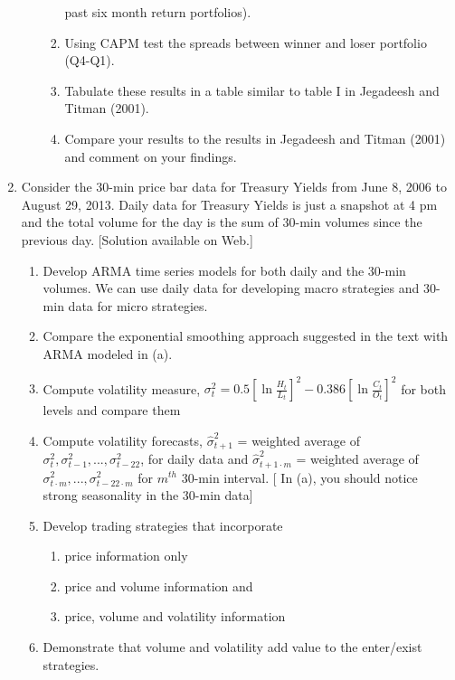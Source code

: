 \begin{enumerate}[1.]
\begin{enumerate}[6.1]
\begin{enumerate}[1.]
past six month return portfolios).
    \item Using CAPM test the spreads between winner and loser portfolio (Q4-Q1).
    \item Tabulate these results in a table similar to table I in Jegadeesh and Titman (2001).
    \item Compare your results to the results in Jegadeesh and Titman (2001) and comment on your findings.
    \end{enumerate}
    \end{enumerate}
    
    
\item Consider the 30-min price bar data for Treasury Yields from June 8, 2006 to August 29, 2013. Daily data for Treasury Yields is just a snapshot at 4 pm and the total volume for the day is the sum of 30-min volumes since the previous day. [Solution available on Web.]
   \begin{enumerate}
   \item Develop ARMA time series models for both daily and the 30-min volumes. We can use daily data
for developing macro strategies and 30-min data for micro strategies.
\item Compare the exponential smoothing approach suggested in the text with ARMA modeled in (a).
   \item Compute volatility measure, $\sigma_t^2 = 0.5[\ln{\frac{H_t}{L_t}}]^2 - 0.386[\ln{\frac{C_t}{O_t}}]^2$ for both levels and compare them
   \item Compute volatility forecasts, $\hat{\sigma}_{t+1}^2$ = weighted average of $\sigma_{t}^2, \sigma_{t-1}^2,...,\sigma_{t-22}^2$, for daily data and $\hat{\sigma}_{t+1\cdot m}^2$ = weighted average of $\sigma_{t\cdot m}^2,...,\sigma_{t-22\cdot m}^2$ for $m^{th}$ 30-min interval. [ In (a), you should notice strong seasonality in the 30-min data]
   \item Develop trading strategies that incorporate
      \begin{enumerate}
      \item price information only
      \item price and volume information and
      \item price, volume and volatility information
      \end{enumerate}
         \item Demonstrate that volume and volatility add value to the enter/exist strategies.
   \end{enumerate}
   \hfill
\par\vspace{\baselineskip}

\end{enumerate}

